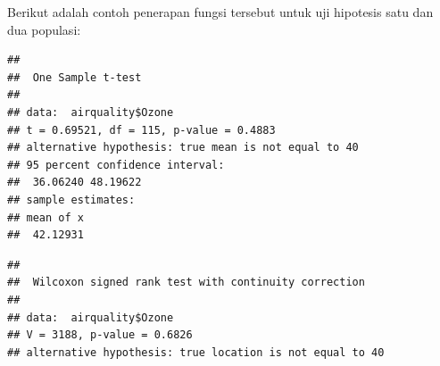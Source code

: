 \documentclass[]{book}
\newenvironment{Shaded}{\begin{snugshade}}{\end{snugshade}}
\newcommand{\CommentTok}[1]{\textcolor[rgb]{0.56,0.35,0.01}{\textit{#1}}}
\newcommand{\DataTypeTok}[1]{\textcolor[rgb]{0.13,0.29,0.53}{#1}}
\newcommand{\DecValTok}[1]{\textcolor[rgb]{0.00,0.00,0.81}{#1}}
\newcommand{\KeywordTok}[1]{\textcolor[rgb]{0.13,0.29,0.53}{\textbf{#1}}}
\newcommand{\NormalTok}[1]{#1}
\newcommand{\OperatorTok}[1]{\textcolor[rgb]{0.81,0.36,0.00}{\textbf{#1}}}
\newcommand{\StringTok}[1]{\textcolor[rgb]{0.31,0.60,0.02}{#1}}
\theoremstyle{definition}
\theoremstyle{definition}
\theoremstyle{definition}
\theoremstyle{remark}
\begin{document}
Berikut adalah contoh penerapan fungsi tersebut untuk uji hipotesis satu dan dua populasi:

\begin{Shaded}
\end{Shaded}

\begin{verbatim}
## 
##  One Sample t-test
## 
## data:  airquality$Ozone
## t = 0.69521, df = 115, p-value = 0.4883
## alternative hypothesis: true mean is not equal to 40
## 95 percent confidence interval:
##  36.06240 48.19622
## sample estimates:
## mean of x 
##  42.12931
\end{verbatim}

\begin{Shaded}
\end{Shaded}

\begin{verbatim}
## 
##  Wilcoxon signed rank test with continuity correction
## 
## data:  airquality$Ozone
## V = 3188, p-value = 0.6826
## alternative hypothesis: true location is not equal to 40
\end{verbatim}
\end{document}
